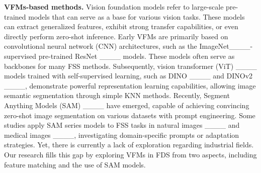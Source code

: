 \noindent \textbf{VFMs-based methods.}
Vision foundation models refer to large-scale pre-trained models that can serve as a base for various vision tasks. These models can extract generalized features, exhibit strong transfer capabilities, or even directly perform zero-shot inference. Early VFMs are primarily based on convolutional neural network (CNN) architectures, such as the ImageNet____-supervised pre-trained ResNet ____ models. These models often serve as backbones for many FSS methods. Subsequently, vision transformer (ViT) ____ models trained with self-supervised learning, such as DINO ____ and DINOv2 ____, demonstrate powerful representation learning capabilities, allowing image semantic segmentation through simple KNN methods. Recently, Segment Anything Models (SAM) ____ have emerged, capable of achieving convincing zero-shot image segmentation on various datasets with prompt engineering. Some studies apply SAM series models to FSS tasks in natural images ____ and medical images ____, investigating domain-specific prompts or adaptation strategies. Yet, there is currently a lack of exploration regarding industrial fields. Our research fills this gap by exploring VFMs in FDS from two aspects, including feature matching and the use of SAM models.

